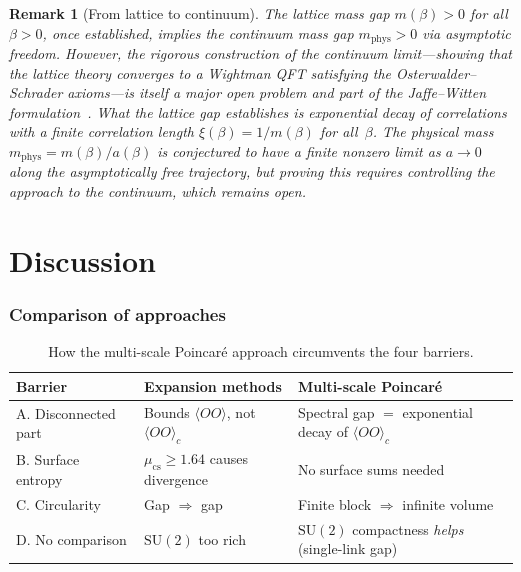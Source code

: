 \documentclass[12pt,a4paper]{article}
\newtheorem{remark}[theorem]{Remark}
\begin{document}
\begin{remark}[From lattice to continuum]
The lattice mass gap $m(\beta)>0$ for all $\beta>0$, once established, implies the continuum mass gap $m_{\mathrm{phys}}>0$ via asymptotic freedom. However, the rigorous \emph{construction} of the continuum limit---showing that the lattice theory converges to a Wightman QFT satisfying the Osterwalder--Schrader axioms---is itself a major open problem and part of the Jaffe--Witten formulation~\cite{JaffeWitten}. What the lattice gap establishes is exponential decay of correlations with a finite correlation length $\xi(\beta)=1/m(\beta)$ for all~$\beta$. The physical mass $m_{\mathrm{phys}}=m(\beta)/a(\beta)$ is conjectured to have a finite nonzero limit as $a\to 0$ along the asymptotically free trajectory, but proving this requires controlling the approach to the continuum, which remains open.
\end{remark}

\part*{Discussion}

\section{Comparison of approaches}\label{sec:compare}

\begin{table}[h]
\centering
\caption{How the multi-scale Poincar\'e approach circumvents the four barriers.}
\label{tab:compare}
\renewcommand{\arraystretch}{1.2}
\begin{tabular}{@{}>{\raggedright}p{2.8cm}p{4.5cm}p{5.5cm}@{}}
\toprule
\textbf{Barrier} & \textbf{Expansion methods} & \textbf{Multi-scale Poincar\'e} \\
\midrule
A. Disconnected part & Bounds $\langle OO\rangle$, not $\langle OO\rangle_c$ & Spectral gap $=$ exponential decay of $\langle OO\rangle_c$ \\
B. Surface entropy & $\mu_{\mathrm{cs}}\ge 1.64$ causes divergence & No surface sums needed \\
C. Circularity & Gap $\Rightarrow$ gap & Finite block $\Rightarrow$ infinite volume \\
D. No comparison & $\mathrm{SU}(2)$ too rich & $\mathrm{SU}(2)$ compactness \emph{helps} (single-link gap) \\
\bottomrule
\end{tabular}
\end{table}
\end{document}
